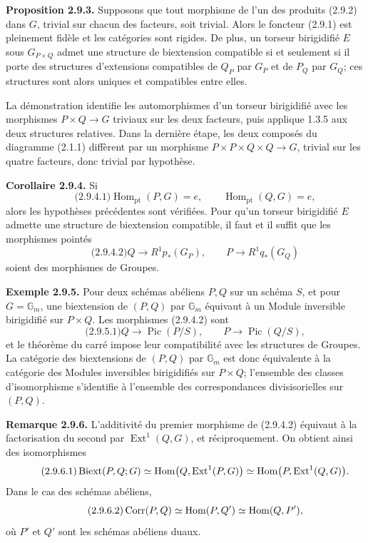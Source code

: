\documentclass[11pt]{article}
\providecommand{\Pic}{\operatorname{Pic}}
\providecommand{\Ext}{\operatorname{Ext}}
\begin{document}
\textbf{Proposition 2.9.3.}  Supposons que tout morphisme de l'un des produits (2.9.2) dans \(G\), trivial sur chacun des facteurs, soit trivial.  Alors le foncteur (2.9.1) est pleinement fidèle et les catégories sont rigides.  De plus, un torseur birigidifié \(E\) sous \(G_{P\times Q}\) admet une structure de biextension compatible si et seulement si il porte des structures d'extensions compatibles de \(Q_P\) par \(G_P\) et de \(P_Q\) par \(G_Q\); ces structures sont alors uniques et compatibles entre elles.

La démonstration identifie les automorphismes d'un torseur birigidifié avec les morphismes \(P\times Q\to G\) triviaux sur les deux facteurs, puis applique 1.3.5 aux deux structures relatives.  Dans la dernière étape, les deux composés du diagramme (2.1.1) diffèrent par un morphisme \(P\times P\times Q\times Q\to G\), trivial sur les quatre facteurs, donc trivial par hypothèse.

\textbf{Corollaire 2.9.4.}  Si
\begin{equation}\qquad\text{(2.9.4.1)}
  \operatorname{Hom}_{\mathrm{pt}}(P,G)=e,
  \qquad
  \operatorname{Hom}_{\mathrm{pt}}(Q,G)=e,
\end{equation}
alors les hypothèses précédentes sont vérifiées.  Pour qu'un torseur birigidifié \(E\) admette une structure de biextension compatible, il faut et il suffit que les morphismes pointés
\begin{equation}\qquad\text{(2.9.4.2)}
  Q\longrightarrow R^1p_*(G_P),
  \qquad
  P\longrightarrow R^1q_*(G_Q)
\end{equation}
soient des morphismes de Groupes.

\textbf{Exemple 2.9.5.}  Pour deux schémas abéliens \(P,Q\) sur un schéma \(S\), et pour \(G=\mathbb G_m\), une biextension de \((P,Q)\) par \(\mathbb G_m\) équivaut à un Module inversible birigidifié sur \(P\times Q\).  Les morphismes (2.9.4.2) sont
\begin{equation}\qquad\text{(2.9.5.1)}
  Q\longrightarrow \Pic(P/S),
  \qquad
  P\longrightarrow \Pic(Q/S),
\end{equation}
et le théorème du carré impose leur compatibilité avec les structures de Groupes.  La catégorie des biextensions de \((P,Q)\) par \(\mathbb G_m\) est donc équivalente à la catégorie des Modules inversibles birigidifiés sur \(P\times Q\); l'ensemble des classes d'isomorphisme s'identifie à l'ensemble des correspondances divisisorielles sur \((P,Q)\).

\textbf{Remarque 2.9.6.}  L'additivité du premier morphisme de (2.9.4.2) équivaut à la factorisation du second par \(\Ext^1(Q,G)\), et réciproquement.  On obtient ainsi des isomorphismes
\begin{equation}\qquad\text{(2.9.6.1)}
  \Biext(P,Q;G)
  \simeq\operatorname{Hom}\bigl(Q,\Ext^1(P,G)\bigr)
  \simeq\operatorname{Hom}\bigl(P,\Ext^1(Q,G)\bigr).
\end{equation}
Dans le cas des schémas abéliens,
\begin{equation}\qquad\text{(2.9.6.2)}
  \operatorname{Corr}(P,Q)\simeq\operatorname{Hom}(P,Q')\simeq\operatorname{Hom}(Q,P'),
\end{equation}
où \(P'\) et \(Q'\) sont les schémas abéliens duaux.
\end{document}
